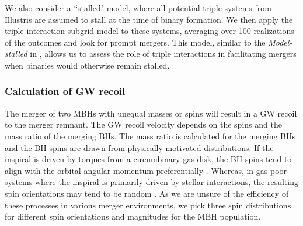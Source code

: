 \documentclass[11pt, letterpaper]{article}
\begin{document}
We also consider a ``stalled" model, where all potential triple systems from Illustris are assumed to stall at the time of binary formation. We then apply the triple interaction subgrid model to these systems, averaging over 100 realizations of the outcomes and look for prompt mergers. This model, similar to the \emph{Model-stalled} in \citet{bonetti_post-newtonian_2018}, allows us to assess the role of triple interactions in facilitating mergers when binaries would otherwise remain stalled.

\subsubsection{Calculation of GW recoil}
\label{sec:GW-recoil-calculation}
The merger of two MBHs with unequal masses or spins will result in a GW recoil to the merger remnant. The GW recoil velocity depends on the spins and the mass ratio of the merging BHs.  The mass ratio is calculated for the merging BHs and the BH spins are drawn from physically motivated distributions. If the inspiral is driven by torques from a circumbinary gas disk, the BH spins tend to align with the orbital angular momentum preferentially \citep{Bogdanovi__2007, Dotti2010,Miller_2013}. Whereas, in gas poor systems where the inspiral is primarily driven by stellar interactions, the resulting spin orientations may tend to be random \citep{Merritt_2012}. As we are unsure of the efficiency of these processes in various merger environments, we pick three spin distributions for different spin orientations and magnitudes for the MBH population. 
\end{document}
